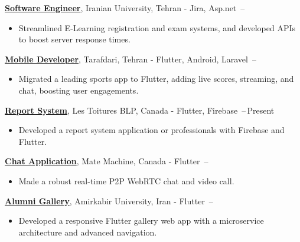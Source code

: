 \documentclass[letterpaper,11pt]{article}
\begin{document}
\BigGap
\href{https://en.iranian.ac.ir}
{\textbf{Software Engineer}}, Iranian University, Tehran - Jira, Asp.net
\hfill {}\,--\,
\begin{itemize}[leftmargin=*, noitemsep, topsep=0pt, partopsep=0pt]
    \item Streamlined E-Learning registration and exam systems, and developed APIs to boost server response times.
\end{itemize}

\BigGap
\href{https://tarafdari.com}
{\textbf{Mobile Developer}}, Tarafdari, Tehran - Flutter, Android, Laravel
\hfill {}\,--\,
\begin{itemize}[leftmargin=*, noitemsep, topsep=0pt, partopsep=0pt]
    \item Migrated a leading sports app to Flutter, adding live scores, streaming, and chat, boosting user engagements.
\end{itemize}



\href{https://toituresblp.ca}
{\textbf{Report System}}, Les Toitures BLP, Canada - Flutter, Firebase
\hfill {}\,--\,Present
\begin{itemize}[leftmargin=*, noitemsep, topsep=0pt, partopsep=0pt]
    \item Developed a report system application or professionals with Firebase and Flutter.
\end{itemize}

\BigGap
\href{https://github.com/aliyazdi75/flutter_chat}
{\textbf{Chat Application}}, Mate Machine, Canada - Flutter
\hfill {}\,--\,
\begin{itemize}[leftmargin=*, noitemsep, topsep=0pt, partopsep=0pt]
    \item Made a robust real-time P2P WebRTC chat and video call.
\end{itemize}

\BigGap
\href{https://gallery.yazdi.dev}
{\textbf{Alumni Gallery}}, Amirkabir University, Iran - Flutter
\hfill {}\,--\,
\begin{itemize}[leftmargin=*, noitemsep, topsep=0pt, partopsep=0pt]
    \item Developed a responsive Flutter gallery web app with a microservice architecture and advanced navigation.
\end{itemize}
\end{document}
